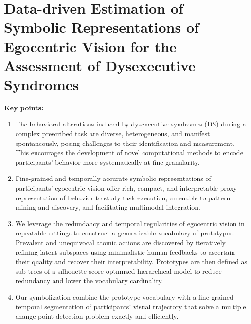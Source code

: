 \chapter[Data-driven estimation of symbolic representations of egocentric vision for the assessment of dysexecutive syndromes]{Data-driven Estimation of Symbolic Representations of Egocentric Vision for the Assessment of Dysexecutive Syndromes}
\label{sec:chapter_5}


\begin{chapterabstract}
    \textbf{Key points:}
    \begin{enumerate}
        \item The behavioral alterations induced by dysexecutive syndromes (DS) during a complex prescribed task are diverse, heterogeneous, and manifest spontaneously, posing challenges to their identification and measurement. This encourages the development of novel computational methods to encode participants' behavior more systematically at fine granularity.


        \item Fine-grained and temporally accurate symbolic representations of participants' egocentric vision offer rich, compact, and interpretable proxy representation of behavior to study task execution, amenable to pattern mining and discovery, and facilitating multimodal integration.

        \item  We leverage the redundancy and temporal regularities of egocentric vision in repeatable settings to construct a generalizable vocabulary of prototypes. Prevalent and unequivocal atomic actions are discovered by iteratively refining latent subspaces using minimalistic human feedbacks to ascertain their quality and recover their interpretability. Prototypes are then defined as sub-trees of a silhouette score-optimized hierarchical model to reduce redundancy and lower the vocabulary cardinality. 

        \item Our symbolization combine the prototype vocabulary with a fine-grained temporal segmentation of participants' visual trajectory that solve a multiple change-point detection problem exactly and efficiently.


\end{enumerate}
\end{chapterabstract}
